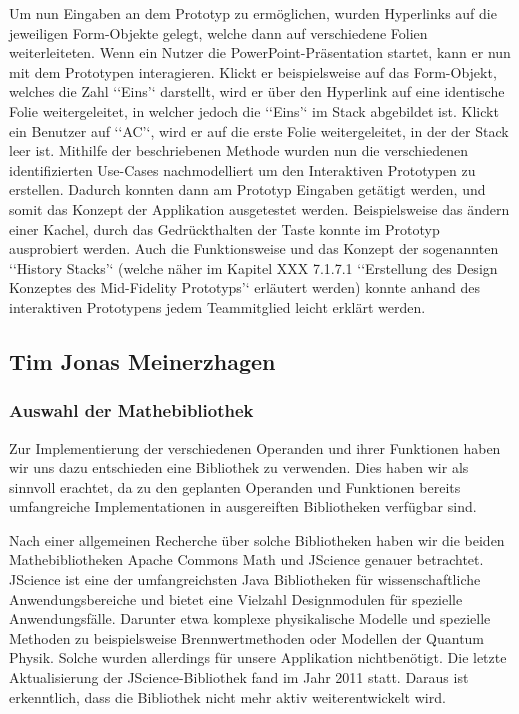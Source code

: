 Um nun Eingaben an dem Prototyp zu ermöglichen, wurden Hyperlinks auf die jeweiligen Form-Objekte gelegt, welche dann auf verschiedene Folien weiterleiteten. Wenn ein Nutzer die PowerPoint-Präsentation startet, kann er nun mit dem Prototypen interagieren. Klickt er beispielsweise auf das Form-Objekt, welches die Zahl ‘‘Eins’‘ darstellt, wird er über den Hyperlink auf eine identische Folie weitergeleitet, in welcher jedoch die ‘‘Eins’‘ im Stack abgebildet ist. Klickt ein Benutzer auf ‘‘AC’‘, wird er auf die erste Folie weitergeleitet, in der der Stack leer ist. Mithilfe der beschriebenen Methode wurden nun die verschiedenen identifizierten Use-Cases nachmodelliert um den Interaktiven Prototypen zu erstellen. Dadurch konnten dann am Prototyp Eingaben getätigt werden, und somit das Konzept der Applikation ausgetestet werden. Beispielsweise das ändern einer Kachel, durch das Gedrückthalten der Taste konnte im Prototyp ausprobiert werden. Auch die Funktionsweise und das Konzept der sogenannten ‘‘History Stacks’‘ (welche näher im Kapitel XXX 7.1.7.1 ‘‘Erstellung des Design Konzeptes des Mid-Fidelity Prototyps’‘ erläutert werden) konnte anhand des interaktiven Prototypens jedem Teammitglied leicht erklärt werden. 


\subsection{Tim Jonas Meinerzhagen}

\subsubsection{Auswahl der Mathebibliothek}

Zur Implementierung der verschiedenen Operanden und ihrer Funktionen haben wir uns dazu entschieden eine Bibliothek zu verwenden. Dies haben wir als sinnvoll erachtet, da zu den geplanten Operanden und Funktionen bereits umfangreiche Implementationen in ausgereiften Bibliotheken verfügbar sind.

Nach einer allgemeinen Recherche über solche Bibliotheken haben wir die beiden Mathebibliotheken Apache Commons Math und JScience genauer betrachtet. 
JScience ist eine der umfangreichsten Java Bibliotheken für wissenschaftliche Anwendungsbereiche und bietet eine Vielzahl Designmodulen für spezielle Anwendungsfälle. Darunter etwa komplexe physikalische Modelle und spezielle Methoden zu beispielsweise Brennwertmethoden oder Modellen der Quantum Physik. Solche wurden allerdings für unsere Applikation nichtbenötigt. Die letzte Aktualisierung der JScience-Bibliothek fand im Jahr 2011 statt. Daraus ist erkenntlich, dass die Bibliothek nicht mehr aktiv weiterentwickelt wird. 

